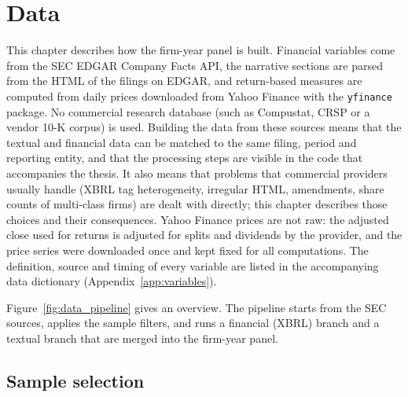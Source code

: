 \chapter{Data}
\label{ch:data}

This chapter describes how the firm-year panel is built. Financial variables
come from the SEC EDGAR Company Facts API, the narrative sections are parsed
from the HTML of the filings on EDGAR, and return-based measures are computed
from daily prices downloaded from Yahoo Finance with the \texttt{yfinance}
package. No commercial research database (such as Compustat, CRSP or a vendor
10-K corpus) is used. Building the data from these sources means that the
textual and financial data can be matched to the same filing, period and
reporting entity, and that the processing steps are visible in the code that
accompanies the thesis. It also means that problems that commercial providers
usually handle (XBRL tag heterogeneity, irregular HTML, amendments, share
counts of multi-class firms) are dealt with directly; this chapter describes
those choices and their consequences. Yahoo Finance prices are not raw: the
adjusted close used for returns is adjusted for splits and dividends by the
provider, and the price series were downloaded once and kept fixed for all
computations. The definition, source and timing of every variable are
listed in the accompanying data dictionary (Appendix~\ref{app:variables}).

Figure~\ref{fig:data_pipeline} gives an overview. The pipeline starts from
the SEC sources, applies the sample filters, and runs a financial (XBRL)
branch and a textual branch that are merged into the firm-year panel.



\section{Sample selection}
\label{sec:sample_selection}

